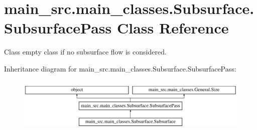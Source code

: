 \hypertarget{classmain__src_1_1main__classes_1_1Subsurface_1_1SubsurfacePass}{\section{main\-\_\-src.\-main\-\_\-classes.\-Subsurface.\-Subsurface\-Pass Class Reference}
\label{classmain__src_1_1main__classes_1_1Subsurface_1_1SubsurfacePass}
}


Class empty class if no subsurface flow is considered.  


Inheritance diagram for main\-\_\-src.\-main\-\_\-classes.\-Subsurface.\-Subsurface\-Pass\-:\begin{figure}[H]
\begin{center}
\leavevmode
\includegraphics[height=2.666667cm]{classmain__src_1_1main__classes_1_1Subsurface_1_1SubsurfacePass}
\end{center}
\end{figure}
